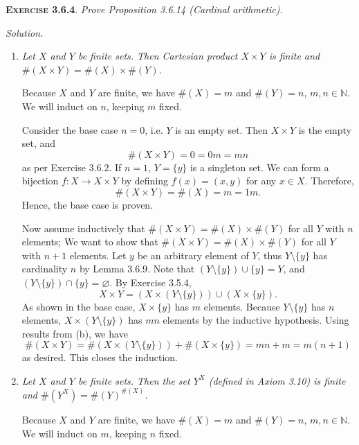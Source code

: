 \documentclass[12pt]{article}
\theoremstyle{remark}
\newenvironment{exer}[2]{
    \noindent \setlength{\parskip}{1em}%
    \textsc{\textbf{Exercise #1}}. \textit{#2} \par
    \noindent \textit{Solution.} %
}{\bigskip}
\begin{document}
\begin{exer}{3.6.4}{
    Prove Proposition 3.6.14 (Cardinal arithmetic).
}
\begin{enumerate}[topsep=0mm,label=(\alph*)]
        \item \textit{%
            Let $X$ and $Y$ be finite sets.
            Then Cartesian product $X \times Y$ is finite and $\#(X \times Y) = \#(X) \times \#(Y)$.
        }
        
            Because $X$ and $Y$ are finite, we have $\#(X) = m$ and $\#(Y) = n$, $m, n \in \mathbb{N}$.
            We will induct on $n$, keeping $m$ fixed.
            
            Consider the base case $n = 0$, i.e. $Y$ is an empty set.
            Then $X \times Y$ is the empty set, and 
            \[
                \#(X \times Y) = 0 = 0m = mn
            \]
            as per Exercise 3.6.2.
            If $n = 1$, $Y = \{ y \}$ is a singleton set.
            We can form a bijection $f : X \to X \times Y$ by defining $f(x) = (x, y)$ for any $x \in X$.
            Therefore,
            \[
                \#(X \times Y) = \#(X) = m = 1m.
            \]
            Hence, the base case is proven.

            Now assume inductively that $\#(X \times Y) = \#(X) \times \#(Y)$ for all $Y$ with $n$ elements;
            We want to show that $\#(X \times Y) = \#(X) \times \#(Y)$ for all $Y$ with $n + 1$ elements.
            Let $y$ be an arbitrary element of $Y$, thus $Y \setminus \{ y \}$ has cardinality $n$ by Lemma 3.6.9.
            Note that $(Y \setminus \{ y \}) \cup \{ y \} = Y$, and $(Y \setminus \{ y \}) \cap \{ y \} = \varnothing$.
            By Exercise 3.5.4,
            \[
                X \times Y = (X \times (Y \setminus \{ y \})) \cup (X \times \{ y \}).
            \]
            As shown in the base case, $X \times \{ y \}$ has $m$ elements.
            Because $Y \setminus \{ y \}$ has $n$ elements, $X \times (Y \setminus \{ y \})$ has $mn$ elements by the inductive hypothesis.
            Using results from (b), we have
            \[
                \#(X \times Y) = \#(X \times (Y \setminus \{ y \})) + \#(X \times \{ y \}) = mn + m = m(n + 1)
            \]
            as desired. This closes the induction.
            
        \item \textit{%
            Let $X$ and $Y$ be finite sets.
            Then the set $Y^X$ (defined in Axiom 3.10) is finite and $\#(Y^X) = \#(Y)^{\#(X)}$.
        }
        
            Because $X$ and $Y$ are finite, we have $\#(X) = m$ and $\#(Y) = n$, $m, n \in \mathbb{N}$.
            We will induct on $m$, keeping $n$ fixed.


\end{enumerate}
\end{exer}
\end{document}
